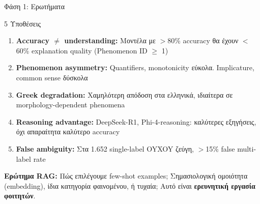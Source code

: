 \documentclass[aspectratio=169,10pt]{beamer}
\begin{document}
\begin{frame}{Φάση 1: Ερωτήματα}
	\begin{block}{5 Υποθέσεις}
		\begin{enumerate}
			\item \textbf{Accuracy $\neq$ understanding:} Μοντέλα με $>$80\% accuracy θα έχουν $<$60\% explanation quality (Phenomenon ID $\geq$ 1)
			\item \textbf{Phenomenon asymmetry:} Quantifiers, monotonicity εύκολα. Implicature, common sense δύσκολα
			\item \textbf{Greek degradation:} Χαμηλότερη απόδοση στα ελληνικά, ιδιαίτερα σε morphology-dependent phenomena
			\item \textbf{Reasoning advantage:} DeepSeek-R1, Phi-4-reasoning: καλύτερες εξηγήσεις, όχι απαραίτητα καλύτερο accuracy
			\item \textbf{False ambiguity:} Στα 1.652 single-label OYXOY ζεύγη, $>$15\% false multi-label rate
		\end{enumerate}
	\end{block}

	\vspace{0.3cm}
	\textbf{Ερώτημα RAG:} Πώς επιλέγουμε few-shot examples; Σημασιολογική ομοιότητα (embedding), ίδια κατηγορία φαινομένου, ή τυχαία; Αυτό είναι \textbf{ερευνητική εργασία φοιτητών}.
\end{frame}
\end{document}

